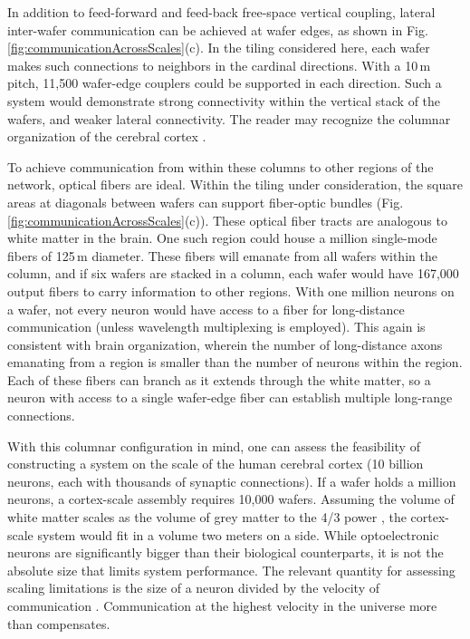 \documentclass[twocolumn]{article}
\begin{document}
{In addition to feed-forward and feed-back free-space vertical coupling, lateral inter-wafer communication can be achieved at wafer edges, as shown in Fig.\,\ref{fig:communicationAcrossScales}(c). In the tiling considered here, each wafer makes such connections to neighbors in the cardinal directions. With a 10\,\textmu m pitch, 11,500 wafer-edge couplers could be supported in each direction. Such a system would demonstrate strong connectivity within the vertical stack of the wafers, and weaker lateral connectivity. The reader may recognize the columnar organization of the cerebral cortex \cite{mo1997}.

To achieve communication from within these columns to other regions of the network, optical fibers are ideal. Within the tiling under consideration, the square areas at diagonals between wafers can support fiber-optic bundles (Fig.\,\ref{fig:communicationAcrossScales}(c)). These optical fiber tracts are analogous to white matter in the brain. One such region could house a million single-mode fibers of 125\,\textmu m diameter. These fibers will emanate from all wafers within the column, and if six wafers are stacked in a column, each wafer would have 167,000 output fibers to carry information to other regions. With one million neurons on a wafer, not every neuron would have access to a fiber for long-distance communication (unless wavelength multiplexing is employed). This again is consistent with brain organization, wherein the number of long-distance axons emanating from a region is smaller than the number of neurons within the region. Each of these fibers can branch as it extends through the white matter, so a neuron with access to a single wafer-edge fiber can establish multiple long-range connections. 

With this columnar configuration in mind, one can assess the feasibility of constructing a system on the scale of the human cerebral cortex (10 billion neurons, each with thousands of synaptic connections). If a wafer holds a million neurons, a cortex-scale assembly requires 10,000 wafers. Assuming the volume of white matter scales as the volume of grey matter to the 4/3 power \cite{zhse2000}, the cortex-scale system would fit in a volume two meters on a side. While optoelectronic neurons are significantly bigger than their biological counterparts, it is not the absolute size that limits system performance. The relevant quantity for assessing scaling limitations is the size of a neuron divided by the velocity of communication \cite{sh2018_ICRC}. Communication at the highest velocity in the universe more than compensates. 

}
\end{document}
